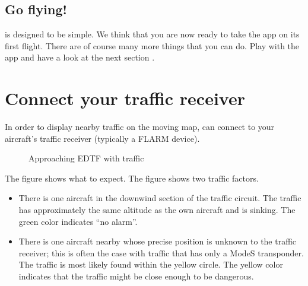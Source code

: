 \documentclass[letterpaper,10pt,english]{sphinxmanual}
\begin{document}
\section{Go flying!}
\label{\detokenize{01-intro/03-firstFlight:go-flying}}
\sphinxAtStartPar
{} is designed to be simple.  We think that you are
now ready to take the app on its first flight.  There are of course many more
things that you can do.  Play with the app and have a look at the next section
{\hyperref[\detokenize{index:sec-steps}]{}}.


\chapter{Connect your traffic receiver}
\label{\detokenize{02-steps/traffic:connect-your-traffic-receiver}}\label{\detokenize{02-steps/traffic::doc}}
\sphinxAtStartPar
In order to display nearby traffic on the moving map,  can connect to your aircraft’s traffic receiver (typically a FLARM
device).

\begin{figure}[htbp]
\centering
\capstart

\noindent{}
\caption{Approaching EDTF with traffic}\label{\detokenize{02-steps/traffic:id1}}\label{\detokenize{02-steps/traffic:edtftraffic}}\end{figure}

\sphinxAtStartPar
The figure {\hyperref[\detokenize{02-steps/traffic:edtftraffic}]{}} shows what to expect.  The figure shows two
traffic factors.
\begin{itemize}
\item {} 
\sphinxAtStartPar
There is one aircraft in the downwind section of the traffic circuit.  The
traffic has approximately the same altitude as the own aircraft and is
sinking.  The green color indicates “no alarm”.

\item {} 
\sphinxAtStartPar
There is one aircraft nearby whose precise position is unknown to the traffic
receiver; this is often the case with traffic that has only a Mode\sphinxhyphen{}S
transponder.  The traffic is most likely found within the yellow circle. The
yellow color indicates that the traffic might be close enough to be dangerous.

\end{itemize}
\end{document}

